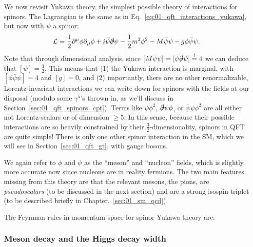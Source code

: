 We now revisit Yukawa theory, the simplest possible theory of interactions for spinors.
The Lagrangian is the same as in Eq.~\ref{eq:01_qft_interactions_yukawa}, but now with $\psi$ a spinor:
\begin{equation}
	\label{eq:01_qft_spinors_yukawa_lagrangian}
	\mathcal{L} = \frac{1}{2}\partial^\mu\phi\partial_\mu\phi + i\bar\psi\cslashed{\partial}\psi - \frac{1}{2}m^2\phi^2 - M\bar\psi\psi - g\phi\bar\psi\psi.
\end{equation}
Note that through dimensional analysis, since $[M\bar\psi\psi] = [\bar\psi\cslashed{\partial}\psi] \mustequal 4$ we can deduce that $[\psi] = \frac{3}{2}$.
This means that (1) the Yukawa interaction is marginal, with $[\phi\bar\psi\psi] = 4$ and $[g] = 0$, and (2) importantly, there are no other renormalizable, Lorentz-invariant interactions we can write down for spinors with the fields at our disposal (modulo some $\gamma^5$'s thrown in, as we'll discuss in Section~\ref{sec:01_qft_spinors_cpt}).
Terms like $\psi\phi^2$, $\cslashed{\partial}\psi\phi$, or $\bar\psi\psi\phi^2$ are all either not Lorentz-scalars or of dimension $\geq 5$.
In this sense, because their possible interactions are so heavily constrained by their $\frac{3}{2}$-dimensionality, spinors in QFT are quite simple!
There is only one other spinor interaction in the SM, which we will see in Section~\ref{sec:01_qft_gt}, with gauge bosons.

We again refer to $\phi$ and $\psi$ as the ``meson'' and ``nucleon'' fields, which is slightly more accurate now since nucleons are in reality fermions.
The two main features missing from this theory are that the relevant mesons, the pions, are \textit{pseudoscalars} (to be discussed in the next section) and are a strong isospin triplet (to be described briefly in Chapter.~\ref{sec:01_sm_qcd}).

\begin{definition}
	\label{def:01_qft_spinors_yukawa_feynman}
	The Feynman rules in momentum space for spinor Yukawa theory are:
	
\end{definition}

\subsubsection{Meson decay and the Higgs decay width}



